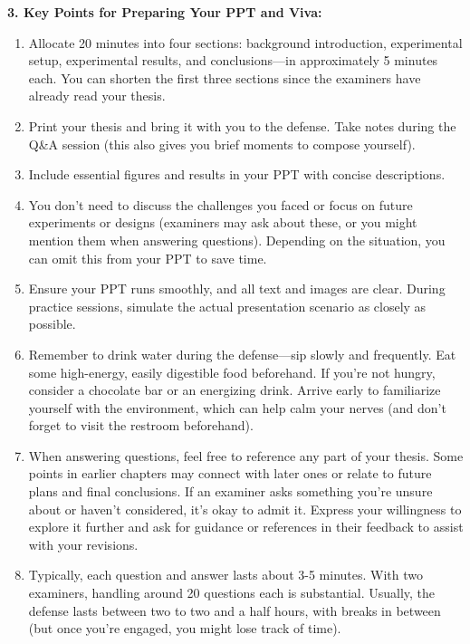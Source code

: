 \textbf{3. Key Points for Preparing Your PPT and Viva:}
\begin{enumerate}
    \item Allocate 20 minutes into four sections: background introduction, experimental setup, experimental results, and conclusions—in approximately 5 minutes each. You can shorten the first three sections since the examiners have already read your thesis.
    \item Print your thesis and bring it with you to the defense. Take notes during the Q\&A session (this also gives you brief moments to compose yourself).
    \item Include essential figures and results in your PPT with concise descriptions.
    \item You don't need to discuss the challenges you faced or focus on future experiments or designs (examiners may ask about these, or you might mention them when answering questions). Depending on the situation, you can omit this from your PPT to save time.
    \item Ensure your PPT runs smoothly, and all text and images are clear. During practice sessions, simulate the actual presentation scenario as closely as possible.
    \item Remember to drink water during the defense—sip slowly and frequently. Eat some high-energy, easily digestible food beforehand. If you're not hungry, consider a chocolate bar or an energizing drink. Arrive early to familiarize yourself with the environment, which can help calm your nerves (and don't forget to visit the restroom beforehand).
    \item When answering questions, feel free to reference any part of your thesis. Some points in earlier chapters may connect with later ones or relate to future plans and final conclusions. If an examiner asks something you're unsure about or haven't considered, it's okay to admit it. Express your willingness to explore it further and ask for guidance or references in their feedback to assist with your revisions.
    \item Typically, each question and answer lasts about 3-5 minutes. With two examiners, handling around 20 questions each is substantial. Usually, the defense lasts between two to two and a half hours, with breaks in between (but once you're engaged, you might lose track of time).
\end{enumerate}


